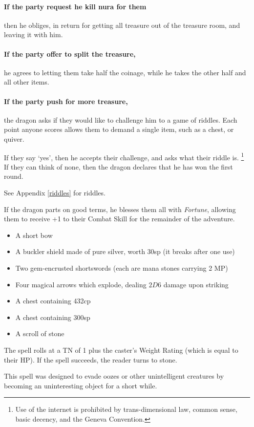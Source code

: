 \begin{multicols}{2}
\paragraph{If the party request he kill nura for them}
then he obliges, in return for getting all treasure out of the treasure room, and leaving it with him.
\paragraph{If the party offer to split the treasure,}
he agrees to letting them take half the coinage, while he takes the other half and all other items.
\paragraph{If the party push for more treasure,}
the dragon asks if they would like to challenge him to a game of riddles.
Each point anyone scores allows them to demand a single item, such as a chest, or quiver.

If they say `yes', then he accepts their challenge, and asks what their riddle is.%
\footnote{Use of the internet is prohibited by trans-dimensional law, common sense, basic decency, and the Geneva Convention.}
If they can think of none,
then the dragon declares that he has won the first round.

See Appendix \ref{riddles} for riddles.

If the dragon parts on good terms, he blesses them all with \textit{Fortune}, allowing them to receive +1 to their Combat Skill for the remainder of the adventure.


\begin{itemize}

	\item{A short bow}
	\item{A buckler shield made of pure silver, worth 30sp (it breaks after one use)}
	\item{Two gem-encrusted shortswords (each are mana stones carrying 2 MP)}
	\item{Four magical arrows which explode, dealing $2D6$ damage upon striking}
	\item{A chest containing 432cp}
	\item{A chest containing 300sp}
	\item{A scroll of stone}

\end{itemize}

The spell rolls at a TN of 1 plus the caster's Weight Rating (which is equal to their HP).
If the spell succeeds, the reader turns to stone.

This spell was designed to evade oozes or other unintelligent creatures by becoming an uninteresting object for a short while.




\end{multicols}


